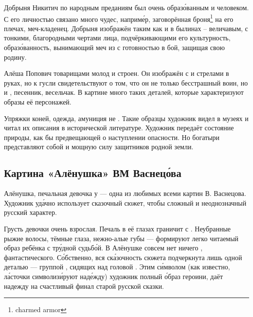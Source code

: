 Добрыня Никитич по народным преданиям был очень образ\'{о}ванным и  человеком. С его личностью связано много чудес, наприм\'{е}р, заговорённая броня\footnote{charmed armor} на его плечах,  меч-кладенец. Добрыня изображён таким как и в былинах -- величавым, с тонкими, благородными чертами лица, подчёркивающими его культурность, образ\'{о}ванность,  вынимающий меч из  с готовностью  в бой, защищая свою родину.

Алёша Попович  товарищами молод и строен. Он изображён с  и стрелами в руках, но  к  гусли свидетельствуют о том, что он не только бесстрашный воин, но и , песенник, весельчак. В картине много таких деталей, которые характеризуют образы её персонажей.

Упряжки коней, одежда, амуниция не . Такие образцы художник видел в музеях и читал их описания в исторической литературе. Художник  передаёт состояние природы, как бы предвещающей о наступлении опасности. Но богатыри представляют собой  и мощную силу защитников родной земли.




\subsection{Картина «Алёнушка» ВМ Васнец\'{о}ва}

Алёнушка, печальная девочка у  --- одна из любимых всеми картин В. Васнецова. Художник уд\'{а}чно использует сказочный сюжет, чтобы  сложный и неоднозначный русский характер.

Грусть девочки очень взрослая. Печаль в её глазах граничит с . Неубранные рыжие волосы, тёмные глаза, нежно-алые губы --- формируют легко читаемый образ ребёнка с тр\'{у}дной судьб\'{о}й.
В Алёнушке совсем нет ничего , фантастического.
С\'{о}бственно, вся ск\'{а}зочность сюжета подчеркнута лишь одной деталью --- группой , сидящих над головой . Этим с\'{и}мволом (как известно, л\'{а}сточки символиз\'{и}руют над\'{е}жду) художник  полный  \'{о}браз героини, даёт надежду на счастливый финал старой русской сказки.

